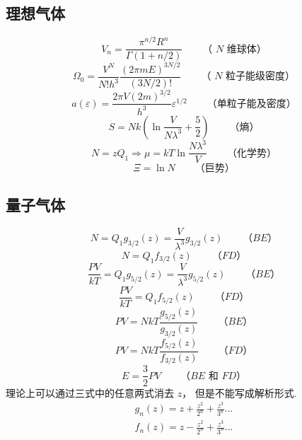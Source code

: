 \subsection{理想气体}
\begin{equation}
{V_n} = \frac{{\pi ^{n/2}}{R^n}}{\Gamma \left( {1 + n/2} \right)}
\qquad
\text{（ $N$ 维球体）}
\end{equation}
\begin{equation}
{\Omega_0} = \frac{V^N}{N!{h^3}}\frac{{\left( {2\pi mE} \right)}^{3N/2}}{\left( {3N/2} \right)!}
\qquad
\text{（ $N$ 粒子能级密度）}
\end{equation}
\begin{equation}
a\left( \varepsilon  \right) = \frac{2\pi V{{\left( {2m} \right)}^{3/2}}}{h^3}{\varepsilon ^{1/2}}
\qquad
\text{（单粒子能及密度）}
\end{equation}
\begin{equation}
S = Nk\left( {\ln \frac{V}{N{\lambda ^3}} + \frac{5}{2}} \right)
\qquad
\text{（熵）}
\end{equation}
\begin{equation}
N = z{Q_1} \Rightarrow \mu  = kT\ln \frac{N{\lambda ^3}}{V}
\qquad
\text{（化学势）}
\end{equation}
\begin{equation}
\Xi  = \ln N
\qquad
\text{（巨势）}
\end{equation}
\subsection{量子气体}
\begin{equation}
N = {Q_1}{g_{3/2}}\left( z \right) = \frac{V}{\lambda ^3}{g_{3/2}}\left( z \right)
\qquad
\text{（$BE$）}
\end{equation}
\begin{equation}
N = {Q_1}{f_{3/2}}\left( z \right)
\qquad
\text{（$FD$）}
\end{equation}
\begin{equation}
\frac{PV}{kT} = {Q_1}{g_{5/2}}\left( z \right) = \frac{V}{\lambda ^3}{g_{5/2}}\left( z \right)
\qquad
\text{（$BE$）}
\end{equation}
\begin{equation}
\frac{PV}{kT} = {Q_1}{f_{5/2}}\left( z \right)
\qquad
\text{（$FD$）}
\end{equation}
\begin{equation}
PV = NkT\frac{{g_{5/2}}(z)}{{g_{3/2}}(z)}
\qquad
\text{（$BE$）}
\end{equation}
\begin{equation}
PV = NkT\frac{{f_{5/2}}(z)}{{f_{3/2}}(z)}
\qquad
\text{（$FD$）}
\end{equation}
\begin{equation}
E = \frac{3}{2}PV
\qquad
\text{（$BE$ 和 $FD$）}
\end{equation}
理论上可以通过三式中的任意两式消去 $z$，  但是不能写成解析形式.
\begin{equation}
\begin{aligned}
{g_n}(z) = z + \frac{z^2}{2^n} + \frac{z^3}{3^n}...\\
{f_n}(z) = z - \frac{z^2}{2^n} + \frac{z^3}{3^n}...
\end{aligned}
\end{equation}
